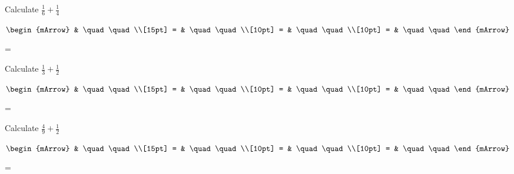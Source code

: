 \begin{mtask}
   \task \begin{exercise} Calculate $ \frac{1}{6} + \frac{1}{4} $
           \begin{envSolution}
             $\begin{mArrow} 
			       & \quad \quad              \\[15pt]
                 = & \quad \quad              \\[10pt]
		   		 = & \quad \quad              \\[10pt]
				 = & \quad \quad 
              \end{mArrow}$
            \begin{shortsolution}  
			     =$ \quad \quad \quad \quad$
			\end{shortsolution}				 
           \end{envSolution}
         \end{exercise}
   \task \begin{exercise} Calculate $ \frac{1}{3} + \frac{1}{2} $
           \begin{envSolution}
             $\begin{mArrow} 
			       & \quad \quad              \\[15pt]
                 = & \quad \quad              \\[10pt]
		   		 = & \quad \quad              \\[10pt]
				 = & \quad \quad 
              \end{mArrow}$
            \begin{shortsolution}  
			     =$ \quad \quad \quad \quad$
			\end{shortsolution}				 
           \end{envSolution}
         \end{exercise}
   \task \begin{exercise} Calculate $ \frac{4}{9} + \frac{1}{2} $
           \begin{envSolution}
             $\begin{mArrow} 
			       & \quad \quad              \\[15pt]
                 = & \quad \quad              \\[10pt]
		   		 = & \quad \quad              \\[10pt]
				 = & \quad \quad 
              \end{mArrow}$
            \begin{shortsolution}  
			     =$ \quad \quad \quad \quad$
			\end{shortsolution}				 

\end{envSolution}
\end{exercise}
\end{mtask}
